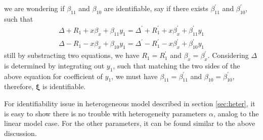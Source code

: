 \documentclass[12pt]{article}
\begin{document}
we are wondering if $\beta_{11}$ and $\beta_{10}$ are identifiable,
say if there exists $\beta_{11}^{'}$ and $\beta_{10}^{'}$, such that
\begin{align*}
  \Delta + R_1 + x\beta_x + \beta_{11}y_1 = \Delta^{'} + R_1^{'} + x\beta_{x}^{'} + \beta_{11}^{'}y_1\\
  \Delta - R_1 - x\beta_x + \beta_{10}y_1 = \Delta^{'} - R_1^{'} -
  x\beta_{x}^{'} + \beta_{10}^{'}y_1
\end{align*}
still by substracting two equations, we have $R_1 = R_1^{'}$ and
$\beta_x = \beta_x^{'}$. Considering $\Delta$ is determined by
integrating out $y_1$, such that matching the two sides of the above
equation for coefficient of $y_1$, we must have $\beta_{11} =
\beta_{11}^{'}$ and $\beta_{10} = \beta_{10}^{'}$, therefore, $\bm
\xi$ is identifiable.

For identifiability issue in heterogeneous model described in section
\ref{sec:heter}, it is easy to show there is no trouble with
heterogeneity parameters $\alpha$, analog to the linear model
case. For the other parameters, it can be found similar to the above
discussion.
\end{document}
